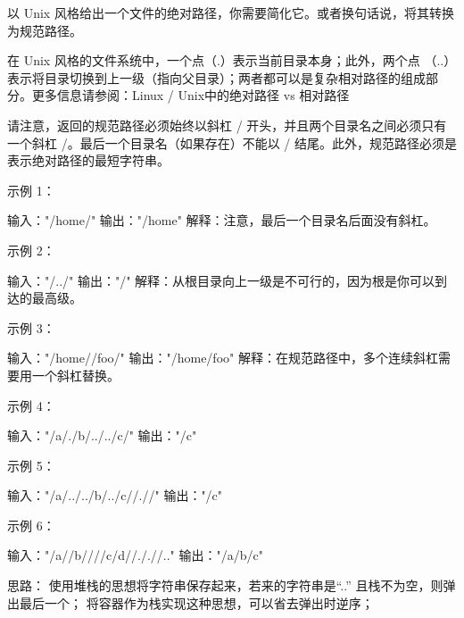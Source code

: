 以 Unix 风格给出一个文件的绝对路径，你需要简化它。或者换句话说，将其转换为规范路径。

在 Unix 风格的文件系统中，一个点（.）表示当前目录本身；此外，两个点 （..） 表示将目录切换到上一级（指向父目录）；两者都可以是复杂相对路径的组成部分。更多信息请参阅：Linux / Unix中的绝对路径 vs 相对路径

请注意，返回的规范路径必须始终以斜杠 / 开头，并且两个目录名之间必须只有一个斜杠 /。最后一个目录名（如果存在）不能以 / 结尾。此外，规范路径必须是表示绝对路径的最短字符串。

 

示例 1：

输入："/home/"
输出："/home"
解释：注意，最后一个目录名后面没有斜杠。

示例 2：

输入："/../"
输出："/"
解释：从根目录向上一级是不可行的，因为根是你可以到达的最高级。

示例 3：

输入："/home//foo/"
输出："/home/foo"
解释：在规范路径中，多个连续斜杠需要用一个斜杠替换。

示例 4：

输入："/a/./b/../../c/"
输出："/c"

示例 5：

输入："/a/../../b/../c//.//"
输出："/c"

示例 6：

输入："/a//b////c/d//././/.."
输出："/a/b/c"






























思路：
使用堆栈的思想将字符串保存起来，若来的字符串是“..” 且栈不为空，则弹出最后一个；
将容器作为栈实现这种思想，可以省去弹出时逆序；

































